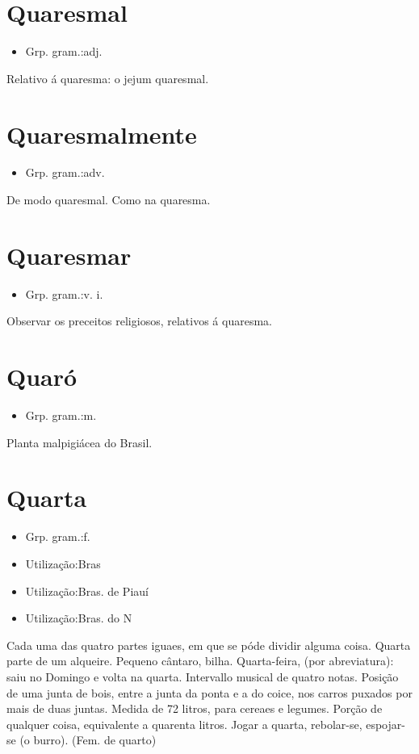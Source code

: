\section{Quaresmal}
\begin{itemize}
\item {Grp. gram.:adj.}
\end{itemize}
Relativo á quaresma: \textunderscore o jejum quaresmal\textunderscore .
\section{Quaresmalmente}
\begin{itemize}
\item {Grp. gram.:adv.}
\end{itemize}
De modo quaresmal.
Como na quaresma.
\section{Quaresmar}
\begin{itemize}
\item {Grp. gram.:v. i.}
\end{itemize}
Observar os preceitos religiosos, relativos á quaresma.
\section{Quaró}
\begin{itemize}
\item {Grp. gram.:m.}
\end{itemize}
Planta malpigiácea do Brasil.
\section{Quarta}
\begin{itemize}
\item {Grp. gram.:f.}
\end{itemize}
\begin{itemize}
\item {Utilização:Bras}
\end{itemize}
\begin{itemize}
\item {Utilização:Bras. de Piauí}
\end{itemize}
\begin{itemize}
\item {Utilização:Bras. do N}
\end{itemize}
Cada uma das quatro partes iguaes, em que se póde dividir alguma coisa.
Quarta parte de um alqueire.
Pequeno cântaro, bilha.
Quarta-feira, (por abreviatura): \textunderscore saiu no Domingo e volta na quarta\textunderscore .
Intervallo musical de quatro notas.
Posição de uma junta de bois, entre a junta da ponta e a do coice, nos carros puxados por mais de duas juntas.
Medida de 72 litros, para cereaes e legumes.
Porção de qualquer coisa, equivalente a quarenta litros.
\textunderscore Jogar a quarta\textunderscore , rebolar-se, espojar-se (o burro).
(Fem. de \textunderscore quarto\textunderscore )
